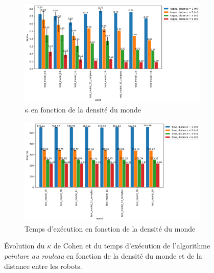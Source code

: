 \documentclass[francais,RandD]{rapportPFE}
\begin{document}
			\begin{figure}[h!]
				\centering
				\begin{subfigure}[t]{0.9\linewidth}
					\includegraphics[width=\linewidth]{graphics/peinture_au_rouleau-kappa_vs_world_for_each_d.png}
					\caption{$\kappa$ en fonction de la densité du monde}
					\label{fig:peinture_au_rouleau-kappa_vs_world}
				\end{subfigure}
				\hfill
				\begin{subfigure}[t]{0.9\linewidth}
						\includegraphics[width=\linewidth]{graphics/peinture_au_rouleau-time_vs_world_for_each_d.png}
						\caption{Temps d'exécution en fonction de la densité du monde}
						\label{fig:peinture_au_rouleau-time_vs_world}
				\end{subfigure}
				\caption{Évolution du $\kappa$ de Cohen et du temps d'exécution de l'algorithme \textit{peinture au rouleau} en fonction de la densité du monde et de la distance entre les robots.}
				\label{fig:peinture_au_rouleau-world}
			\end{figure}
\end{document}
